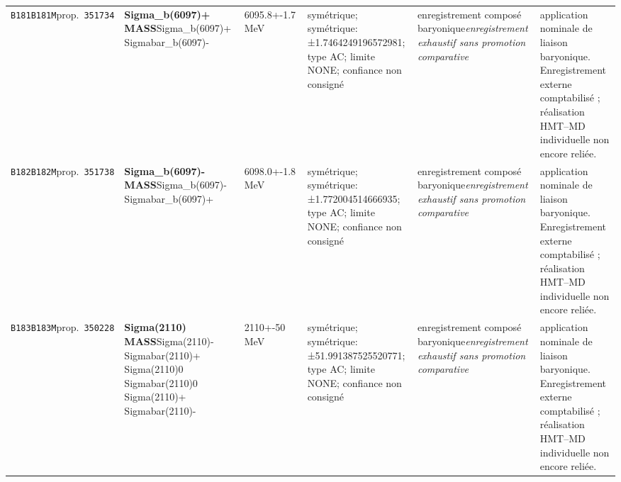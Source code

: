 \begin{landscape}
\begin{longtable}{L{1.85cm}L{4.45cm}L{2.35cm}L{4.05cm}L{3.35cm}L{7.15cm}}
\texttt{B181}\newline \texttt{B181M}\newline prop.\ \texttt{351734} & \textbf{Sigma\_\allowbreak{}b(6097)+ MASS}\newline Sigma\_\allowbreak{}b(6097)+ \textbar{}\allowbreak{} Sigmabar\_\allowbreak{}b(6097)- & 6095.8+-1.7\,MeV & symétrique; symétrique: ±1.7464249196572981; type AC; limite NONE; confiance non consigné & enregistrement composé baryonique\newline \emph{enregistrement exhaustif sans promotion comparative} & application nominale de liaison baryonique. Enregistrement externe comptabilisé ; réalisation HMT--MD individuelle non encore reliée. \\
\texttt{B182}\newline \texttt{B182M}\newline prop.\ \texttt{351738} & \textbf{Sigma\_\allowbreak{}b(6097)- MASS}\newline Sigma\_\allowbreak{}b(6097)- \textbar{}\allowbreak{} Sigmabar\_\allowbreak{}b(6097)+ & 6098.0+-1.8\,MeV & symétrique; symétrique: ±1.772004514666935; type AC; limite NONE; confiance non consigné & enregistrement composé baryonique\newline \emph{enregistrement exhaustif sans promotion comparative} & application nominale de liaison baryonique. Enregistrement externe comptabilisé ; réalisation HMT--MD individuelle non encore reliée. \\
\texttt{B183}\newline \texttt{B183M}\newline prop.\ \texttt{350228} & \textbf{Sigma(2110) MASS}\newline Sigma(2110)- \textbar{}\allowbreak{} Sigmabar(2110)+ \textbar{}\allowbreak{} Sigma(2110)0 \textbar{}\allowbreak{} Sigmabar(2110)0 \textbar{}\allowbreak{} Sigma(2110)+ \textbar{}\allowbreak{} Sigmabar(2110)- & 2110+-50\,MeV & symétrique; symétrique: ±51.991387525520771; type AC; limite NONE; confiance non consigné & enregistrement composé baryonique\newline \emph{enregistrement exhaustif sans promotion comparative} & application nominale de liaison baryonique. Enregistrement externe comptabilisé ; réalisation HMT--MD individuelle non encore reliée. \\

\end{longtable}
\end{landscape}
